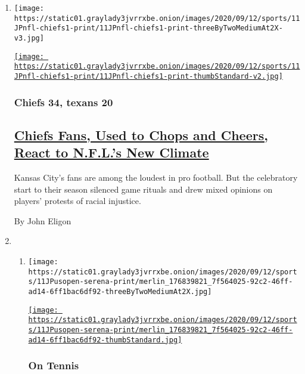 \begin{enumerate}
\def\labelenumi{\arabic{enumi}.}
\item
  \texttt{[image: https://static01.graylady3jvrrxbe.onion/images/2020/09/12/sports/11JPnfl-chiefs1-print/11JPnfl-chiefs1-print-threeByTwoMediumAt2X-v3.jpg]}

  \href{/2020/09/11/sports/football/nfl-chiefs-texans.html}{\texttt{[image: https://static01.graylady3jvrrxbe.onion/images/2020/09/12/sports/11JPnfl-chiefs1-print/11JPnfl-chiefs1-print-thumbStandard-v2.jpg]}}

  \hypertarget{chiefs-34-texans-20}{%
  \subsubsection{Chiefs 34, texans 20}\label{chiefs-34-texans-20}}

  \hypertarget{chiefs-fans-used-to-chops-and-cheers-react-to-nfls-new-climate}{%
  \subsection{\texorpdfstring{\href{/2020/09/11/sports/football/nfl-chiefs-texans.html}{Chiefs
  Fans, Used to Chops and Cheers, React to N.F.L.'s New
  Climate}}{Chiefs Fans, Used to Chops and Cheers, React to N.F.L.'s New Climate}}\label{chiefs-fans-used-to-chops-and-cheers-react-to-nfls-new-climate}}

  Kansas City's fans are among the loudest in pro football. But the
  celebratory start to their season silenced game rituals and drew mixed
  opinions on players' protests of racial injustice.

  By John Eligon
\item
  \begin{enumerate}
  \def\labelenumii{\arabic{enumii}.}
  \item
    \texttt{[image: https://static01.graylady3jvrrxbe.onion/images/2020/09/12/sports/11JPusopen-serena-print/merlin\_176839821\_7f564025-92c2-46ff-ad14-6ff1bac6df92-threeByTwoMediumAt2X.jpg]}

    \href{/2020/09/11/sports/tennis/us-open-serena-williams.html}{\texttt{[image: https://static01.graylady3jvrrxbe.onion/images/2020/09/12/sports/11JPusopen-serena-print/merlin\_176839821\_7f564025-92c2-46ff-ad14-6ff1bac6df92-thumbStandard.jpg]}}

    \hypertarget{on-tennis}{%
    \subsubsection{On Tennis}\label{on-tennis}}


\end{enumerate}
\end{enumerate}
